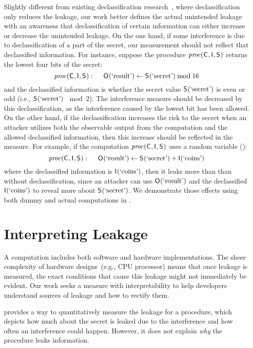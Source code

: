 Slightly different from existing declassification
research~\cite{sabelfeld2003model,chong2004security}, where
declassification only reduces the leakage, our work better defines the
actual unintended leakage with an awareness that declassification of
certain information can either increase or decrease the unintended
leakage.  On the one hand, if some interference is due to
declassification of a part of the secret, our measurement should not
reflect that declassified information. For instance, suppose the procedure
$\mathit{proc}(\mathsf{C}_{}, \mathsf{I}_{}, \mathsf{S}_{})$ returns the lowest four bits of
the secret:
\[\mathit{proc}(\mathsf{C}_{}, \mathsf{I}_{}, \mathsf{S}_{}):
	 \hspace{3ex} \mathsf{O}_{}(\textrm{`result'})\gets\mathsf{S}_{}(\textrm{`secret'})\bmod16
\]
and the declassified information is whether the secret value
$\mathsf{S}_{}(\textrm{`secret'})$ is even or odd (i.e., $\mathsf{S}_{}(\textrm{`secret'})$
$\bmod 2$). The interference measure should be decreased by this
declassification, as the interference caused by the lowest bit has
been allowed. On the other hand, if the declassification increases the
risk to the secret when an attacker utilizes both the observable
output from the computation and the allowed declassified information,
then this increase should be reflected in the measure. For example, if
the computation $\mathit{proc}(\mathsf{C}_{}, \mathsf{I}_{}, \mathsf{S}_{})$ uses a random
variable \AIIFn{}(\coinsVar):
\[\mathit{proc}(\mathsf{C}_{}, \mathsf{I}_{}, \mathsf{S}_{}):
\hspace{3ex}	\mathsf{O}_{}(\textrm{`result'})\gets \mathsf{S}_{}(\textrm{`secret'}) + \mathsf{I}_{}(\textrm{`coins'}) 
\]
where the declassified information is $\mathsf{I}_{}(\textrm{`coins'})$, then it
leaks more than than \proc without declassification, since an attacker
can use $\mathsf{O}_{}(\textrm{`result'})$ and the declassified $\mathsf{I}_{}(\textrm{`coins'})$ to
reveal more about $\mathsf{S}_{}(\textrm{`secret'})$.  We demonstrate those
effects using both dummy and actual computations in
.

\section{Interpreting Leakage}
\label{sec:intro:interpret}
A computation includes both software and hardware implementations. The
sheer complexity of hardware designs~(e.g., CPU processor) means that
once leakage is measured, the exact conditions that cause this leakage
might not immediately be evident.  Our work seeks a measure with
interpretability to help developers understand sources of leakage and
how to rectify them.

 provides a way to quantitatively measure the
leakage for a procedure, which depicts how much about the secret is
leaked due to the interference and how often an interference could
happen.  However, it does not explain \textit{why} the procedure leaks
information.

